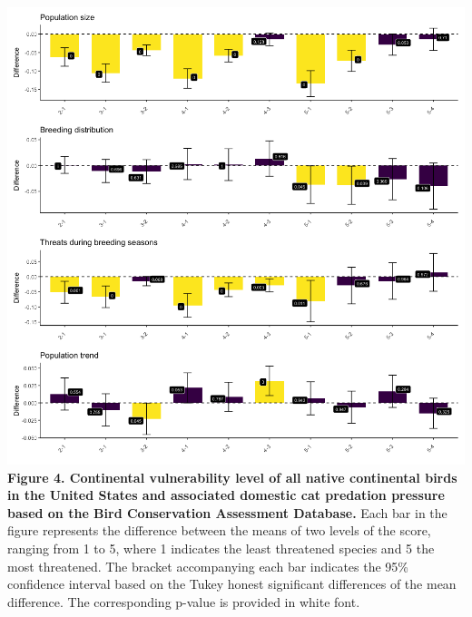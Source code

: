 \documentclass[
  super,
  review,
  3p]{elsarticle}
\begin{document}
\includegraphics{Figure4.png} \textbf{Figure 4. Continental
vulnerability level of all native continental birds in the United States
and associated domestic cat predation pressure based on the Bird
Conservation Assessment Database.} Each bar in the figure represents the
difference between the means of two levels of the score, ranging from 1
to 5, where 1 indicates the least threatened species and 5 the most
threatened. The bracket accompanying each bar indicates the 95\%
confidence interval based on the Tukey honest significant differences of
the mean difference. The corresponding p-value is provided in white
font.
\end{document}
